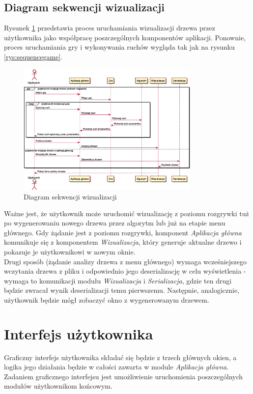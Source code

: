 \documentclass{article}
\let\oldsection\section
\renewcommand\section{\clearpage\oldsection}
\newcommand{\modulename}[1]{\textit{#1}}
\begin{document}
	\subsection{Diagram sekwencji wizualizacji}
	Rysunek \ref{rys:sequencevisualise} przedstawia proces uruchamiania wizualizacji drzewa przez użytkownika jako współpracę poszczególnych komponentów aplikacji. Ponownie, proces uruchamiania gry i wykonywania ruchów wygląda tak jak na rysunku \ref{rys:sequencegame}. 
	\begin{figure}[h]
		\centering
		\includegraphics[width=0.8\textwidth]{visualization_sequence}
		\caption{Diagram sekwencji wizualizacji}
		\label{rys:sequencevisualise}
	\end{figure}

	\noindent Ważne jest, że użytkownik może uruchomić wizualizację z poziomu rozgrywki tuż po wygenerowaniu nowego drzewa przez algorytm lub już na etapie menu głównego. Gdy żądanie jest z poziomu rozgrywki, komponent \modulename{Aplikacja główna} komunikuje się z komponentem \modulename{Wizualizacja}, który generuje aktualne drzewo i pokazuje je użytkownikowi w nowym oknie. \\
	
	 \noindent Drugi sposób (żądanie analizy drzewa z menu głównego) wymaga wcześniejszego wczytania drzewa z pliku i odpowiednio jego deserializację w celu wyświetlenia - wymaga to komunikacji modułu \modulename{Wizualizacja} i \modulename{Serializacja}, gdzie ten drugi będzie zwracał wynik deserializacji temu pierwszemu. Następnie, analogicznie, użytkownik będzie mógł zobaczyć okno z wygenerowanym drzewem.
	
	\section{Interfejs użytkownika}
	Graficzny interfejs użytkownika składać się będzie z trzech głównych okien, a logika jego działania będzie w całości zawarta w module \modulename{Aplikacja główna}. Zadaniem graficznego interfejsu jest umożliwienie uruchomienia poszczególnych modułów użytkownikom końcowym.
	
\end{document}
